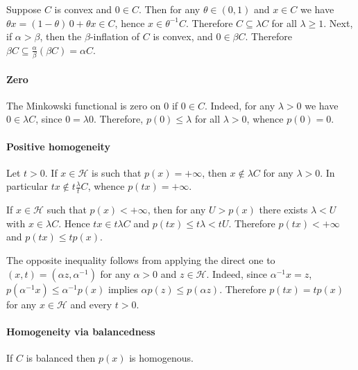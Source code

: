 \documentclass[a4paper]{article}
\newcommand{\Hcal}{\mathcal{H}}
\begin{document}
Suppose $C$ is convex and $0\in C$. Then for any $\theta \in (0, 1)$ and $x\in C$
we have $\theta x = (1 - \theta)\, 0 + \theta x \in C$, hence $x \in \theta^{-1} C$.
Therefore $C \subseteq \lambda C$ for all $\lambda \geq 1$. Next, if $\alpha > \beta$,
then the $\beta$-inflation of $C$ is convex, and $0 \in \beta C$. Therefore $\beta C
\subseteq \tfrac\alpha\beta (\beta C) = \alpha C$.


\paragraph{Zero} %
\label{par:zero}

The Minkowski functional is zero on $0$ if $0\in C$. Indeed, for any $\lambda > 0$
we have $0 \in \lambda C$, since $0 = \lambda 0$. Therefore, $p(0) \leq \lambda$
for all $\lambda > 0$, whence $p(0) = 0$.


\paragraph{Positive homogeneity} %
\label{par:pos_homogeneity}

Let $t > 0$. If $x\in\Hcal$ is such that $p(x) = +\infty$, then $x\notin \lambda C$
for any $\lambda>0$. In particular $t x\notin t \tfrac\lambda{t} C$, whence $p(tx)
= +\infty$.

If $x \in \Hcal$ such that $p(x) < +\infty$, then for any $U > p(x)$ there exists
$\lambda < U$ with $x\in \lambda C$. Hence $t x \in t \lambda C$ and $p(t x) \leq
t \lambda < t U$. Therefore $p(t x) < +\infty$ and $p(t x) \leq t p(x)$.

The opposite inequality follows from applying the direct one to $(x, t) = (\alpha
z, \alpha^{-1})$ for any $\alpha > 0$ and $z \in \Hcal$. Indeed, since $\alpha^{-1}
x = z$, $p(\alpha^{-1} x) \leq \alpha^{-1} p(x)$ implies $\alpha p(z) \leq p(\alpha z)$.
Therefore $p(t x) = t p(x)$ for any $x \in \Hcal$ and every $t > 0$.


\paragraph{Homogeneity via balancedness} %
\label{par:homogeneity_via_balancedness}

If $C$ is balanced then $p(x)$ is homogenous.
\end{document}
